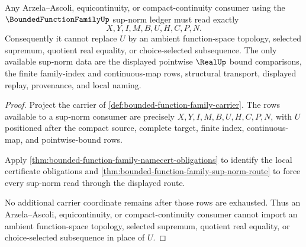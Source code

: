 \begin{theorem}
\label{thm:bounded-function-family-sup-norm-nonescape}
Any Arzela--Ascoli, equicontinuity, or compact-continuity consumer using the $\BoundedFunctionFamilyUp$ sup-norm ledger must read exactly
$$
X,Y,I,M,B,U,H,C,P,N.
$$
Consequently it cannot replace $U$ by an ambient function-space topology, selected supremum, quotient real equality, or choice-selected subsequence. The only available sup-norm data are the displayed pointwise $\RealUp$ bound comparisons, the finite family-index and continuous-map rows, structural transport, displayed replay, provenance, and local naming.
\end{theorem}
\begin{proof}
Project the carrier of \autoref{def:bounded-function-family-carrier}. The rows available to a sup-norm consumer are precisely $X,Y,I,M,B,U,H,C,P,N$, with $U$ positioned after the compact source, complete target, finite index, continuous-map, and pointwise-bound rows.

Apply \autoref{thm:bounded-function-family-namecert-obligations} to identify the local certificate obligations and \autoref{thm:bounded-function-family-sup-norm-route} to force every sup-norm read through the displayed route.

No additional carrier coordinate remains after those rows are exhausted. Thus an Arzela--Ascoli, equicontinuity, or compact-continuity consumer cannot import an ambient function-space topology, selected supremum, quotient real equality, or choice-selected subsequence in place of $U$.
\end{proof}




